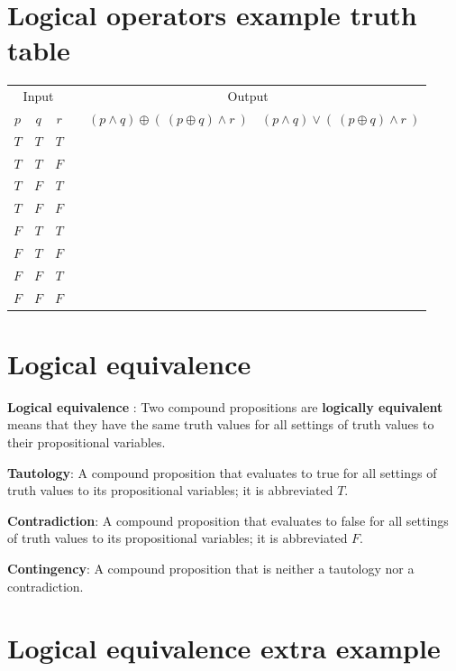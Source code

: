\documentclass[12pt, oneside]{article}
\begin{document}
\begin{flushright}
\end{flushright} \section*{Logical operators example truth table}


\begin{center}
    \begin{tabular}{ccc||p{3in}|c|c}
    \multicolumn{3}{c||}{Input}  & \multicolumn{3}{c}{Output} \\
    $p$ & $q$ & $r$  &  &  $(p \land q) \oplus (~ ( p \oplus q) \land r~)$ & $(p \land q) \vee (~ ( p \oplus q) \land r~)$ \\
    \hline
    $T$ & $T$  & $T$ &   && \\
    $T$ & $T$  & $F$ &   && \\
    $T$ & $F$  & $T$ &   && \\
    $T$ & $F$  & $F$ &   && \\
    $F$ & $T$  & $T$ &   && \\
    $F$ & $T$  & $F$ &   && \\
    $F$ & $F$  & $T$ &   && \\
    $F$ & $F$  & $F$ &   && \\
    \end{tabular}
\end{center}
    \vfill \vfill
\section*{Logical equivalence}


{\bf Logical equivalence }: Two compound  propositions are {\bf logically  equivalent} means that  they 
have the  same  truth  values for all settings of truth  values to their propositional  variables.

{\bf Tautology}:  A compound proposition that evaluates to true
for all settings of truth  values to its propositional  variables; it is  abbreviated $T$.

{\bf Contradiction}: A compound proposition that  evaluates  to  false 
for  all settings of truth  values to its propositional  variables; it  is abbreviated $F$.

{\bf Contingency}: A compound proposition that is neither a tautology nor a contradiction.
 \vfill
\section*{Logical equivalence extra example}
\end{document}
